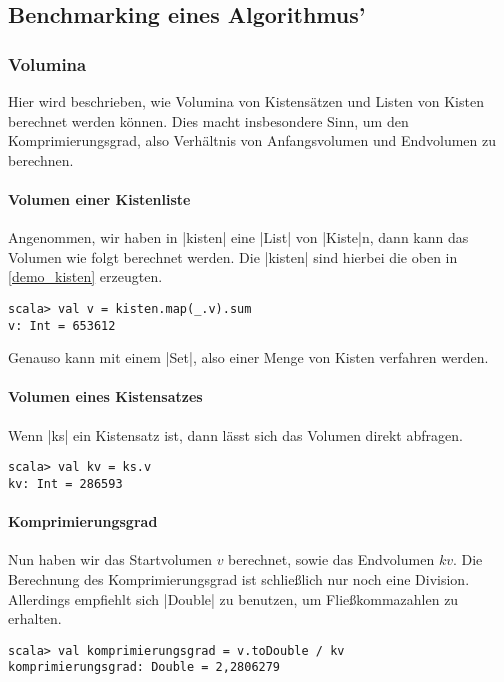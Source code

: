 \subsection{Benchmarking eines Algorithmus'}
\subsubsection{Volumina}
 Hier wird beschrieben, wie Volumina von Kistensätzen und Listen von Kisten berechnet werden können.
 Dies macht insbesondere Sinn, um den Komprimierungsgrad, also Verhältnis von Anfangsvolumen und Endvolumen zu berechnen.

\paragraph{Volumen einer Kistenliste}
 Angenommen, wir haben in |kisten| eine |List| von |Kiste|n, dann kann das Volumen wie folgt berechnet werden.
 Die |kisten| sind hierbei die oben in \ref{demo_kisten} erzeugten.
\begin{lstlisting}
scala> val v = kisten.map(_.v).sum
v: Int = 653612
\end{lstlisting}
 Genauso kann mit einem |Set|, also einer Menge von Kisten verfahren werden.
\paragraph{Volumen eines Kistensatzes}
 Wenn |ks| ein Kistensatz ist, dann lässt sich das Volumen direkt abfragen.
\begin{lstlisting}
scala> val kv = ks.v
kv: Int = 286593
\end{lstlisting}
\paragraph{Komprimierungsgrad}
 Nun haben wir das Startvolumen $v$ berechnet, sowie das Endvolumen $kv$.
 Die Berechnung des Komprimierungsgrad ist schließlich nur noch eine Division.
 Allerdings empfiehlt sich |Double| zu benutzen, um Fließkommazahlen zu erhalten.
\begin{lstlisting}
scala> val komprimierungsgrad = v.toDouble / kv
komprimierungsgrad: Double = 2,2806279
\end{lstlisting}

